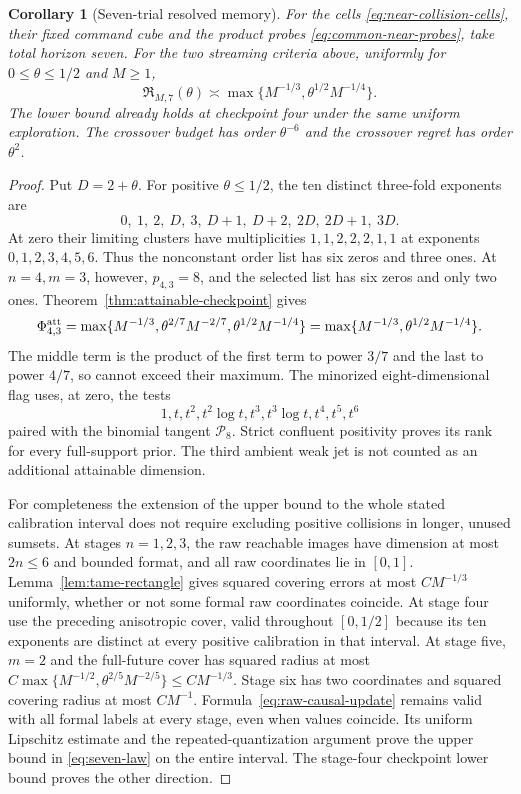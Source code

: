 \documentclass[11pt]{amsart}
\newtheorem{corollary}[theorem]{Corollary}
\theoremstyle{definition}\newtheorem{definition}[theorem]{Definition}
\theoremstyle{remark}\newtheorem{remark}[theorem]{Remark}
\begin{document}
\begin{corollary}[Seven-trial resolved memory]\label{cor:seven-trial}
For the cells \eqref{eq:near-collision-cells}, their fixed command cube
and the product probes \eqref{eq:common-near-probes}, take total horizon
seven. For the two streaming criteria above, uniformly for
$0\le\theta\le1/2$ and $M\ge1$,
\begin{equation}\label{eq:seven-law}
 \mathfrak R_{M,7}(\theta)\asymp
    \max\{M^{-1/3},\theta^{1/2}M^{-1/4}\}.
\end{equation}
The lower bound already holds at checkpoint four under the same uniform
exploration. The crossover budget has order $\theta^{-6}$ and the
crossover regret has order $\theta^2$.
\end{corollary}
\begin{proof}
Put $D=2+\theta$. For positive $\theta\le1/2$, the ten distinct
three-fold exponents are
\[
 0,\ 1,\ 2,\ D,\ 3,\ D+1,\ D+2,\ 2D,\ 2D+1,\ 3D.
\]
At zero their limiting clusters have multiplicities
$1,1,2,2,2,1,1$ at exponents $0,1,2,3,4,5,6$.
Thus the nonconstant order list has six zeros and three ones.
At $n=4,m=3$, however, $p_{4,3}=8$, and the selected list has six
zeros and only two ones. Theorem~\ref{thm:attainable-checkpoint} gives
\[
 \Phi^{\rm att}_{4,3}
 =\max\{M^{-1/3},\theta^{2/7}M^{-2/7},
                         \theta^{1/2}M^{-1/4}\}
 =\max\{M^{-1/3},\theta^{1/2}M^{-1/4}\}.
\]
The middle term is the product of the first term to power $3/7$ and
the last to power $4/7$, so cannot exceed their maximum. The minorized
eight-dimensional flag uses, at zero, the tests
\[
 1,t,t^2,t^2\log t,t^3,t^3\log t,t^4,t^5,t^6
\]
paired with the binomial tangent $\mathcal P_8$. Strict confluent
positivity proves its rank for every full-support prior. The third
ambient weak jet is not counted as an additional attainable dimension.

For completeness the extension of the upper bound to the whole stated
calibration interval does not require excluding positive collisions in
longer, unused sumsets. At stages $n=1,2,3$, the raw reachable images
have dimension at most $2n\le6$ and bounded format, and all raw
coordinates lie in $[0,1]$. Lemma~\ref{lem:tame-rectangle} gives
squared covering errors at most $CM^{-1/3}$ uniformly, whether or not
some formal raw coordinates coincide. At stage four use the preceding
anisotropic cover, valid throughout $[0,1/2]$ because its ten exponents
are distinct at every positive calibration in that interval. At stage
five, $m=2$ and the full-future cover has squared radius at most
$C\max\{M^{-1/2},\theta^{2/5}M^{-2/5}\}\le CM^{-1/3}$.
Stage six has two coordinates and squared covering radius at most
$CM^{-1}$. Formula~\eqref{eq:raw-causal-update} remains valid with
all formal labels at every stage, even when values coincide. Its uniform
Lipschitz estimate and the repeated-quantization argument prove the upper
bound in \eqref{eq:seven-law} on the entire interval. The stage-four
checkpoint lower bound proves the other direction.


\end{proof}
\end{document}
